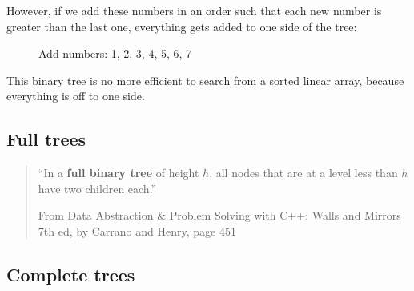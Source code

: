 \documentclass[a4paper,12pt,oneside]{book}
\begin{document}
    However, if we add these numbers in an order such that each new number
    is greater than the last one, everything gets added to one side of the tree:

    \begin{figure}[h]
        \begin{center}
        \end{center}
        \caption{Add numbers: 1, 2, 3, 4, 5, 6, 7}
    \end{figure}

    This binary tree is no more efficient to search from a sorted linear array,
    because everything is off to one side.

    \subsection{Full trees}

    \begin{quote}
        ``In a \textbf{full binary tree} of height $h$, all nodes that are at a level less than $h$
        have two children each.''
        
        \footnotesize
        From Data Abstraction \& Problem Solving with C++: Walls and Mirrors 7th ed, by Carrano and Henry, page 451
    \end{quote}
    
    
    \subsection{Complete trees}
    
\end{document}
